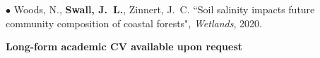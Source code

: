 \documentclass[11pt]{article}
\begin{document}
$\bullet$ Woods, N., \textbf{Swall, J.~L.}, Zinnert, J.~C. ``Soil salinity
  impacts future community composition of coastal forests", \textit{Wetlands},
  2020.




\vspace*{0.3in}
\textbf{Long-form academic CV available upon request}
\end{document}
